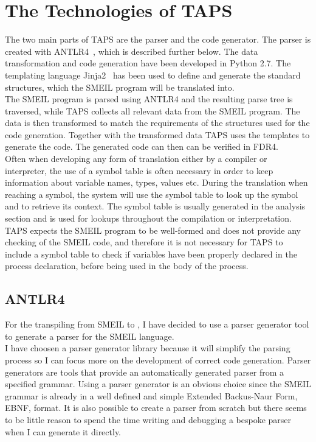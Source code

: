 \section{The Technologies of TAPS}
The two main parts of TAPS are the parser and the code generator. The parser is created with ANTLR4~\cite{antlr}, which is described further below. The data transformation and code generation have been developed in Python 2.7. The templating language Jinja2~\cite{jinja2} has been used to define and generate the standard \cspm{} structures, which the SMEIL program will be translated into.\\

The SMEIL program is parsed using ANTLR4 and the resulting parse tree is traversed, while TAPS collects all relevant data from the SMEIL program. The data is then transformed to match the requirements of the \cspm{} structures used for the code generation. Together with the transformed data TAPS uses the templates to generate the \cspm{} code. The generated code can then can be verified in FDR4. \\

Often when developing any form of translation either by a compiler or interpreter, the use of a symbol table is often necessary in order to keep information about variable names, types, values etc. During the translation when reaching a symbol, the system will use the symbol table to look up the symbol and to retrieve its context. The symbol table is usually generated in the analysis section and is used for lookups throughout the compilation or interpretation. TAPS expects the SMEIL program to be well-formed and does not provide any checking of the SMEIL code, and therefore it is not necessary for TAPS to include a symbol table to check if variables have been properly declared in the process declaration, before being used in the body of the process.
\subsection{ANTLR4}
For the transpiling from SMEIL to \cspm{}, I have decided to use a parser generator tool to generate a parser for the SMEIL language.\\

I have choosen a parser generator library because it will simplify the parsing process so I can focus more on the development of correct code generation. Parser generators are tools that provide an automatically generated parser from a specified grammar. Using a parser generator is an obvious choice since the SMEIL grammar is already in a well defined and simple Extended Backus-Naur Form, EBNF, format. It is also possible to create a parser from scratch but there seems to be little reason to spend the time writing and debugging a bespoke parser when I can generate it directly. \\

